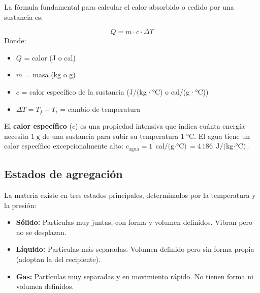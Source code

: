 \documentclass[12pt, letterpaper]{article}
\begin{document}
La fórmula fundamental para calcular el calor absorbido o cedido por una sustancia es:

\begin{cuadroteoria}
  $$Q = m \cdot c \cdot \Delta T$$
  Donde:
  \begin{itemize}[leftmargin=*]
    \item $Q$ = calor (J o cal)
    \item $m$ = masa (kg o g)
    \item $c$ = calor específico de la sustancia (J/(kg·°C) o cal/(g·°C))
    \item $\Delta T = T_f - T_i$ = cambio de temperatura
  \end{itemize}
\end{cuadroteoria}

El \textbf{calor específico} ($c$) es una propiedad intensiva que indica cuánta energía necesita $1\;\text{g}$ de una sustancia para subir su temperatura $1\;°\text{C}$. El agua tiene un calor específico excepcionalmente alto: $c_{\text{agua}} = 1\;\text{cal/(g$\cdot$°C)} = 4\,186\;\text{J/(kg$\cdot$°C)}$.

\subsection{Estados de agregación}

La materia existe en tres estados principales, determinados por la temperatura y la presión:

\begin{cuadrosolucion}
  \begin{itemize}[leftmargin=*]
    \item \textbf{Sólido:} Partículas muy juntas, con forma y volumen definidos. Vibran pero no se desplazan.
    \item \textbf{Líquido:} Partículas más separadas. Volumen definido pero sin forma propia (adoptan la del recipiente).
    \item \textbf{Gas:} Partículas muy separadas y en movimiento rápido. No tienen forma ni volumen definidos.
  \end{itemize}
\end{cuadrosolucion}
\end{document}
